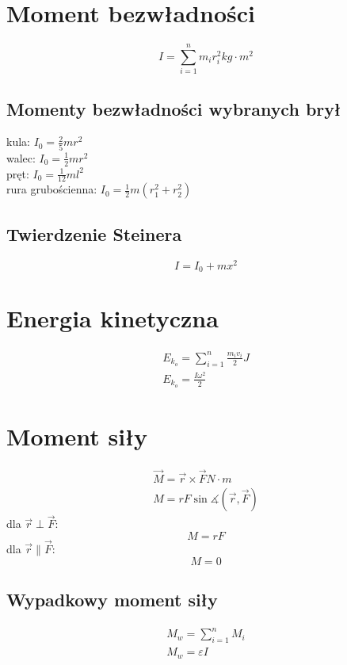   \section{Moment bezwładności}
    \begin{equation}
      I = \sum_{i=1}^n m_ir_i^2 \unit{kg\cdot m^2}
    \end{equation}
      \subsection{Momenty bezwładności wybranych brył}
      kula: $I_0 = \frac{2}{5}mr^2$\\
      walec: $I_0 = \frac{1}{2}mr^2$\\
      pręt: $I_0 = \frac{1}{12}ml^2$\\
      rura grubościenna: $I_0 = \frac{1}{2}m(r_1^2 + r_2^2)$
    \subsection{Twierdzenie Steinera}
      \begin{equation}
        I = I_0 +mx^2
      \end{equation}
  \section{Energia kinetyczna}
    \begin{gather}
      E_{k_o} = \sum_{i=1}^n \frac{m_iv_i}{2} \unit{J}\\
      E_{k_o} = \frac{I\omega^2}{2}
    \end{gather}
  \section{Moment siły}
    \begin{gather}
      \vec M = \vec r\times\vec F \unit{N\cdot m}\\
      M = rF\sin\measuredangle(\vec r, \vec F)
    \end{gather}
    dla $\vec r \perp \vec F$:
    \begin{equation}
      M = rF
    \end{equation}
    dla $\vec r \parallel \vec F$:
    \begin{equation}
      M = 0
    \end{equation}
    \subsection{Wypadkowy moment siły}
      \begin{gather}
        M_w = \sum_{i=1}^n M_i\\
        M_w = \varepsilon I
      \end{gather}
